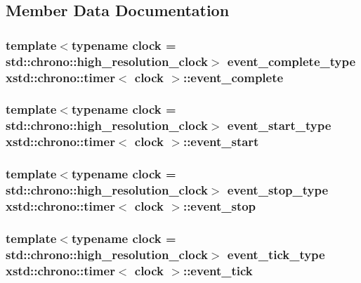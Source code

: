 \subsection{Member Data Documentation}
\hypertarget{classxstd_1_1chrono_1_1timer_ac12f83ed705997b32c1dcf8853cf93c9}{
\subsubsection[{event\-\_\-complete}]{\setlength{\rightskip}{0pt plus 5cm}template$<$typename clock  = std\-::chrono\-::high\-\_\-resolution\-\_\-clock$>$ event\-\_\-complete\-\_\-type {\bf xstd\-::chrono\-::timer}$<$ clock $>$\-::event\-\_\-complete}}\label{classxstd_1_1chrono_1_1timer_ac12f83ed705997b32c1dcf8853cf93c9}
\hypertarget{classxstd_1_1chrono_1_1timer_acd6563ae4202b5d67856562d5a024894}{
\subsubsection[{event\-\_\-start}]{\setlength{\rightskip}{0pt plus 5cm}template$<$typename clock  = std\-::chrono\-::high\-\_\-resolution\-\_\-clock$>$ event\-\_\-start\-\_\-type {\bf xstd\-::chrono\-::timer}$<$ clock $>$\-::event\-\_\-start}}\label{classxstd_1_1chrono_1_1timer_acd6563ae4202b5d67856562d5a024894}
\hypertarget{classxstd_1_1chrono_1_1timer_a2f14e4ebe72f6c127f564f2dc4e97909}{
\subsubsection[{event\-\_\-stop}]{\setlength{\rightskip}{0pt plus 5cm}template$<$typename clock  = std\-::chrono\-::high\-\_\-resolution\-\_\-clock$>$ event\-\_\-stop\-\_\-type {\bf xstd\-::chrono\-::timer}$<$ clock $>$\-::event\-\_\-stop}}\label{classxstd_1_1chrono_1_1timer_a2f14e4ebe72f6c127f564f2dc4e97909}
\hypertarget{classxstd_1_1chrono_1_1timer_a7bfca0bacd30aabd2bf7a69e25f2574c}{
\subsubsection[{event\-\_\-tick}]{\setlength{\rightskip}{0pt plus 5cm}template$<$typename clock  = std\-::chrono\-::high\-\_\-resolution\-\_\-clock$>$ event\-\_\-tick\-\_\-type {\bf xstd\-::chrono\-::timer}$<$ clock $>$\-::event\-\_\-tick}}\label{classxstd_1_1chrono_1_1timer_a7bfca0bacd30aabd2bf7a69e25f2574c}
